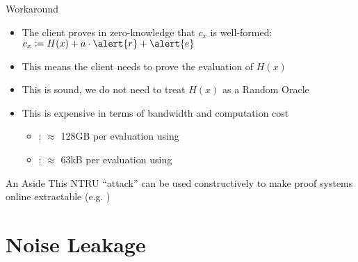 \documentclass[xcolor=table,10pt,aspectratio=169]{beamer}
\begin{document}
\begin{frame}[label={sec:org2954f86}]{Workaround}
\begin{itemize}
\item The client proves in zero-knowledge that \(c_{x}\) is well-formed: \(c_{x} \coloneqq H(x) + a \cdot \alert{r} + \alert{e}\)
\item This means the client needs to prove the evaluation of \(H(x)\)
\item This is sound, we do not need to treat \(H(x)\) as a Random Oracle
\item This is expensive in terms of bandwidth and computation cost
\begin{itemize}
\item \cite{PKC:ADDS21}: \(\approx\) 128GB per evaluation using \cite{C:YAZXYW19}
\item \cite{AC:AlbGur24}: \(\approx\) 63kB per evaluation using \cite{C:BeuSei23}
\end{itemize}
\end{itemize}
\begin{alertblock}{An Aside}
This NTRU ``attack'' can be used constructively to make proof systems online extractable (e.g. \cite{EC:ADDG24})
\end{alertblock}
\end{frame}
\section{Noise Leakage}
\label{sec:orgef3ffe2}
\end{document}
